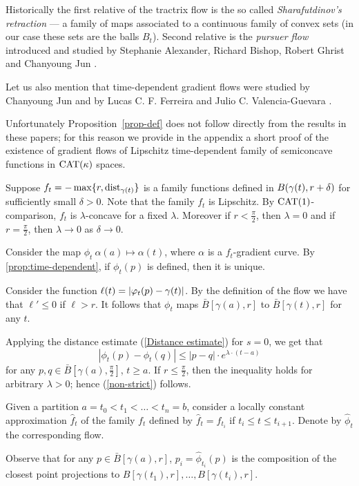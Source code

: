 \documentclass[oneside,a4paper, 12pt]{article}
\begin{document}
Historically the first relative of the tractrix flow
is the so called \emph{Sharafutdinov's retraction} \cite{sharafutdinov} --- a family of maps associated to a continuous family of convex sets (in our case these sets are the balls $B_t$). 
Second relative is the \emph{pursuer flow} introduced and studied by Stephanie Alexander, Richard Bishop, Robert Ghrist and Chanyoung Jun \cite{ABG,jun-thesis,jun,jun:grad}.

Let us also mention that time-dependent gradient flows were studied by Chanyoung Jun \cite{jun-thesis,jun:grad} and  by Lucas C. F. Ferreira and Julio C. Valencia-Guevara \cite{ferreira-valencia}.

Unfortunately Proposition~\ref{prop-def} does not follow directly from the results in these papers; for this reason we provide in the appendix a short proof of the existence of
gradient flows of Lipschitz time-dependent family of semiconcave functions in $\mathrm{CAT}(\kappa)$ spaces.

Suppose $f_t=- \max\{r,\mathop{\rm dist}\nolimits_{\gamma(t)}\}$ is a family functions defined in $B(\gamma(t),r\z+\delta)$ for sufficiently small $\delta>0$.
Note that the family $f_t$ is Lipschitz.
By $\mathrm{CAT}(1)$-comparison, $f_t$ is $\lambda$-concave for a fixed $\lambda$.
Moreover if $r<\tfrac\pi2$, then $\lambda=0$ and if $r=\tfrac\pi2$, then $\lambda\to 0$ as $\delta\to 0$. 

Consider the map $\phi_t\:\alpha(a)\mapsto \alpha(t)$, where $\alpha$ is a $f_t$-gradient curve.
By \ref{prop:time-dependent}, if $\phi_t(p)$ is defined, then it is unique.

Consider the function $\ell(t)\z=|\phi_t(p)-\gamma(t)|$.
By the definition of the flow we have that $\ell'\le 0$ if $\ell> r$.
It follows that $\phi_t$ maps $\bar B[\gamma(a),r]$ to $\bar B[\gamma(t),r]$ for any $t$.


Applying the distance estimate (\ref{Distance estimate}) for $s=0$, we get that 
\[|\phi_t(p)-\phi_t(q)|\le |p-q|\cdot e^{\lambda\cdot (t-a)}\]
for any $p,q\in \bar B[\gamma(a),\tfrac\pi2]$, $t\ge a$.
If $r\le \tfrac\pi2$, then the inequality holds for arbitrary $\lambda> 0$;
hence (\ref{non-strict}) follows.

Given a partition $a=t_0<t_1<\dots<t_n=b$, consider a locally constant approximation $\hat f_t$ of the family $f_t$ defined by $\hat f_t=f_{t_i}$ if $t_i\le t\le t_{i+1}$.
Denote by $\hat\phi_t$ the corresponding flow.

Observe that for any $p\in \bar B[\gamma(a),r]$, $p_i=\hat\phi_{t_i}(p)$ is the composition of the closest point projections to $B[\gamma(t_1),r],\dots,B[\gamma(t_i),r]$.
\end{document}
